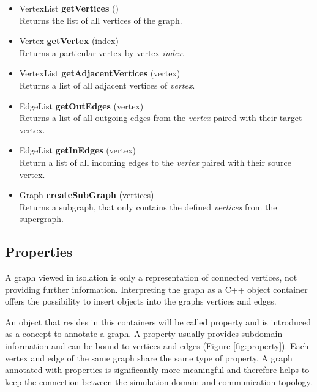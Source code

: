 \begin{itemize}
  \item VertexList \textbf{getVertices} ()\\
    Returns the list of all vertices of the graph.
    
  \item  Vertex \textbf{getVertex} (index)\\
    Returns a particular vertex by vertex \textit{index}.

  \item  VertexList \textbf{getAdjacentVertices} (vertex)\\
    Returns a list of all adjacent vertices of \textit{vertex}.

  \item  EdgeList \textbf{getOutEdges} (vertex)\\
    Returns a list of all outgoing edges from the \textit{vertex}
    paired with their target vertex.

  \item  EdgeList \textbf{getInEdges} (vertex)\\
    Return a list of all incoming edges to the \textit{vertex}
    paired with their source vertex.

  \item  Graph \textbf{createSubGraph} (vertices)\\
    Returns a subgraph, that only contains the defined
    \textit{vertices} from the supergraph.
\end{itemize}

\subsection{Properties}
A graph viewed in isolation is only a representation of connected
vertices, not providing further information. Interpreting the graph as
a C++ object container offers the possibility to insert objects into the graphs
vertices and edges.

An object that resides in this containers will be called property and
is introduced as a concept to annotate a graph. A property usually
provides subdomain information and can be bound to vertices and edges
(Figure \ref{fig:property}). Each vertex and edge of the same graph
share the same type of property. A graph annotated with
properties is significantly more meaningful and therefore helps to
keep the connection between the simulation domain and communication
topology.

